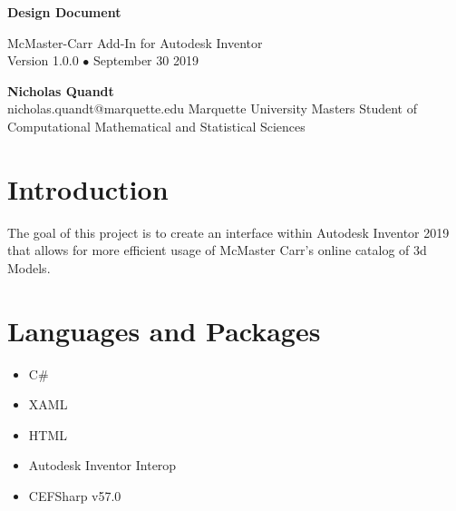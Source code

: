 \documentclass[12pt, letterpaper]{article}
\begin{document}
\begin{titlepage}
   \begin{flushright}
       \vspace*{5cm}
 
       {\Huge \textbf{Design Document}}
 
       \vspace{0.5cm}
        McMaster-Carr Add-In for Autodesk Inventor\\
        Version 1.0.0 $\bullet$ September 30 2019
 
       \vspace{1.5cm}
 
       \textbf{Nicholas Quandt}
       \\
       nicholas.quandt@marquette.edu
       \vfill
       Marquette University Masters Student of\\
       Computational Mathematical and Statistical Sciences\\
       \vspace{1cm}
 
   \end{flushright}
\end{titlepage}

\section{Introduction}
The goal of this project is to create an interface within Autodesk Inventor 2019 that allows for more efficient usage of McMaster Carr's online catalog of 3d Models. 
\section{Languages and Packages}
\begin{multicols}{2}

\begin{itemize}
    \item C\#
    \item XAML
    \item HTML
    \item Autodesk Inventor Interop
    \item CEFSharp v57.0
\end{itemize}
\end{multicols}
\end{document}
